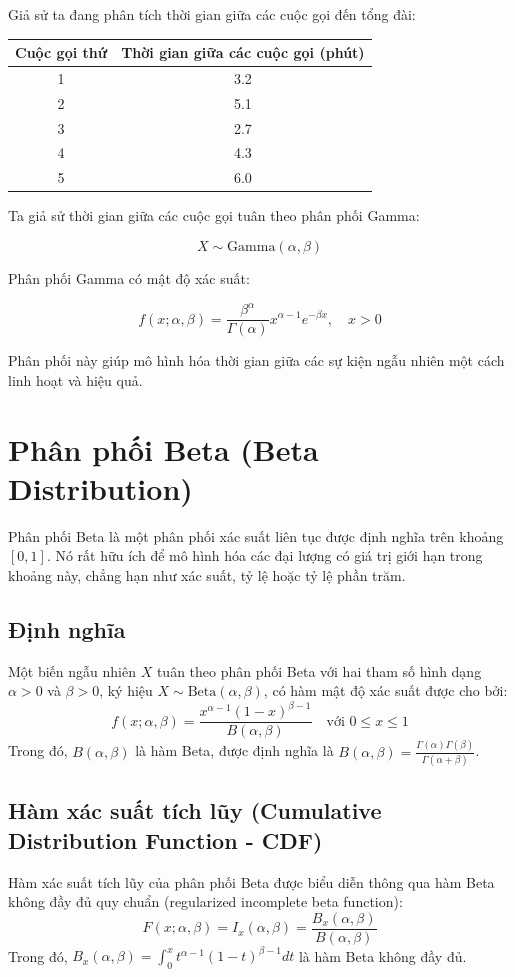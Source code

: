 Giả sử ta đang phân tích thời gian giữa các cuộc gọi đến tổng đài:

\begin{center}
\begin{tabular}{|c|c|}
\hline
Cuộc gọi thứ & Thời gian giữa các cuộc gọi (phút) \\
\hline
1 & 3.2 \\
2 & 5.1 \\
3 & 2.7 \\
4 & 4.3 \\
5 & 6.0 \\
\hline
\end{tabular}
\end{center}

Ta giả sử thời gian giữa các cuộc gọi tuân theo phân phối Gamma:

\[
X \sim \text{Gamma}(\alpha, \beta)
\]

Phân phối Gamma có mật độ xác suất:

\[
f(x; \alpha, \beta) = \frac{\beta^\alpha}{\Gamma(\alpha)} x^{\alpha - 1} e^{-\beta x}, \quad x > 0
\]

Phân phối này giúp mô hình hóa thời gian giữa các sự kiện ngẫu nhiên một cách linh hoạt và hiệu quả.

\section{Phân phối Beta (Beta Distribution)}
Phân phối Beta là một phân phối xác suất liên tục được định nghĩa trên khoảng $[0, 1]$. Nó rất hữu ích để mô hình hóa các đại lượng có giá trị giới hạn trong khoảng này, chẳng hạn như xác suất, tỷ lệ hoặc tỷ lệ phần trăm.

\subsection{Định nghĩa}
Một biến ngẫu nhiên $X$ tuân theo phân phối Beta với hai tham số hình dạng $\alpha > 0$ và $\beta > 0$, ký hiệu $X \sim \text{Beta}(\alpha, \beta)$, có hàm mật độ xác suất được cho bởi:
\[ f(x; \alpha, \beta) = \frac{x^{\alpha-1}(1-x)^{\beta-1}}{B(\alpha, \beta)} \quad \text{với } 0 \le x \le 1 \]
Trong đó, $B(\alpha, \beta)$ là hàm Beta, được định nghĩa là $B(\alpha, \beta) = \frac{\Gamma(\alpha)\Gamma(\beta)}{\Gamma(\alpha+\beta)}$.

\subsection{Hàm xác suất tích lũy (Cumulative Distribution Function - CDF)}
Hàm xác suất tích lũy của phân phối Beta được biểu diễn thông qua hàm Beta không đầy đủ quy chuẩn (regularized incomplete beta function):
\[ F(x; \alpha, \beta) = I_x(\alpha, \beta) = \frac{B_x(\alpha, \beta)}{B(\alpha, \beta)} \]
Trong đó, $B_x(\alpha, \beta) = \int_0^x t^{\alpha-1}(1-t)^{\beta-1} dt$ là hàm Beta không đầy đủ.

